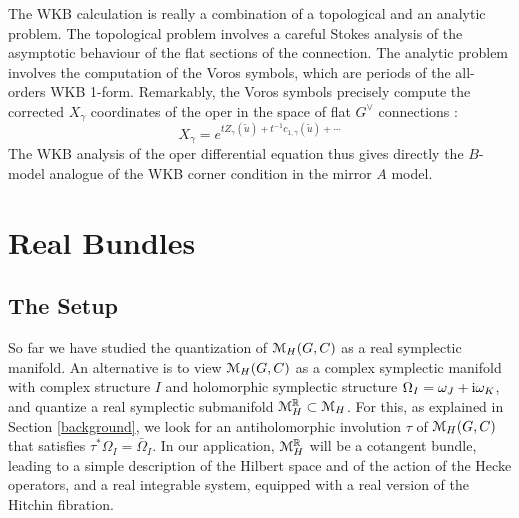 \documentclass[11pt,a4paper]{article}
\begin{document}
The WKB calculation is really a combination of a topological and an analytic problem. The topological problem involves a careful Stokes analysis of the asymptotic behaviour of the flat sections of the connection. The analytic problem involves the computation of the Voros symbols, which are periods of the all-orders WKB 1-form. Remarkably, the Voros symbols precisely compute the corrected $X_\gamma$ coordinates of the oper in the space of flat $G^\vee$ connections \cite{Gaiotto:2014bza}:
\begin{equation}
X_\gamma = e^{t Z_\gamma(\tilde u) + t^{-1} c_{1,\gamma}(\tilde u)  + \cdots}
\end{equation}
The WKB analysis  of the oper differential equation thus gives directly the $B$-model analogue of the WKB corner condition in the mirror $A$ model. 

\section{Real Bundles}\label{realb}

\subsection{The Setup}\label{setup}
So far we have studied the quantization of ${\mathcal M}_H(G,C)$ as a real symplectic manifold.   
An alternative is to view ${\mathcal M}_H(G,C) $ as a complex symplectic manifold with complex structure $I$ and holomorphic symplectic structure 
$\Omega_I=\omega_J+{\mathrm i} \omega_K$, and quantize a real symplectic submanifold ${\mathcal M}_H^{\mathbb{R}} \subset {\mathcal M}_H$.    For this, as explained in Section \ref{background}, we look for an antiholomorphic involution $\tau$ of ${\mathcal M}_H(G,C)$ 
that satisfies $\tau^*\Omega_I=\bar\Omega_I$.   In our application, ${\mathcal M}_H^{\mathbb{R}}$ will be a cotangent bundle, leading to a simple description of the Hilbert space
and of the action of the Hecke operators, and  a real integrable system, equipped with a real version of the Hitchin fibration.
\end{document}
